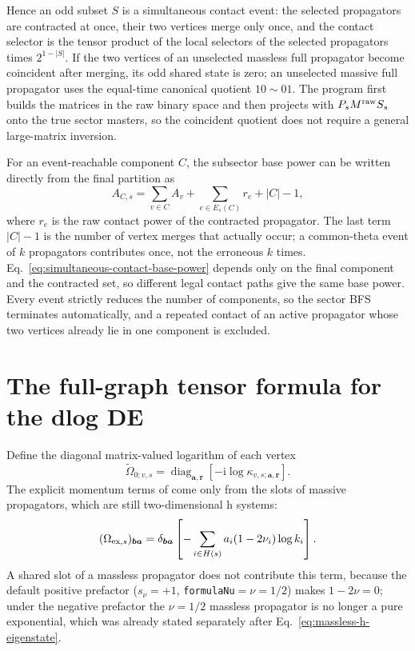 \documentclass[11pt,a4paper]{article}
\newcommand{\ii}{\mathrm i}
\begin{document}
Hence an odd subset $S$ is a simultaneous contact event: the selected propagators are contracted at once, their two vertices merge only once, and the contact selector is the tensor product of the local selectors of the selected propagators times $2^{1-|S|}$. If the two vertices of an unselected massless full propagator become coincident after merging, its odd shared state is zero; an unselected massive full propagator uses the equal-time canonical quotient $10\sim01$. The program first builds the matrices in the raw binary space and then projects with $P_sM^{\rm raw}S_s$ onto the true sector masters, so the coincident quotient does not require a general large-matrix inversion.

For an event-reachable component $C$, the subsector base power can be written directly from the final partition as
\begin{equation}
 A_{C,s}=\sum_{v\in C}A_v
 +\sum_{e\in E_s(C)}r_e+|C|-1,
 \label{eq:simultaneous-contact-base-power}
\end{equation}
where $r_e$ is the raw contact power of the contracted propagator. The last term $|C|-1$ is the number of vertex merges that actually occur; a common-theta event of $k$ propagators contributes once, not the erroneous $k$ times. Eq.~\eqref{eq:simultaneous-contact-base-power} depends only on the final component and the contracted set, so different legal contact paths give the same base power.
Every event strictly reduces the number of components, so the sector BFS terminates automatically, and a repeated contact of an active propagator whose two vertices already lie in one component is excluded.

\section{The full-graph tensor formula for the dlog DE}
\label{sec:dlog-tensor}

Define the diagonal matrix-valued logarithm of each vertex
\begin{equation}
 \widetilde\Omega_{0;v,s}
 =\operatorname{diag}_{\bm a,\bm r}
 \left[-\ii\log\kappa_{v,s;\bm a,\bm r}\right].
 \label{eq:global-omega0}
\end{equation}
The explicit momentum terms of \cite{Chen:2023eic} come only from the slots of massive propagators, which are still two-dimensional h systems:
\begin{equation}
 (\Omega_{{\rm ex},s})_{\bm b\bm a}
 =\delta_{\bm b\bm a}
 \left[-\sum_{i\in H(s)}a_i(1-2\nu_i)\log k_i\right].
 \label{eq:global-omega-ex}
\end{equation}
A shared slot of a massless propagator does not contribute this term, because the default positive prefactor
($s_\nu=+1$, \texttt{formulaNu}$=\nu=1/2$) makes $1-2\nu=0$; under the negative prefactor the
$\nu=1/2$ massless propagator is no longer a pure exponential, which was already stated separately after
Eq.~\eqref{eq:massless-h-eigenstate}.
\end{document}
